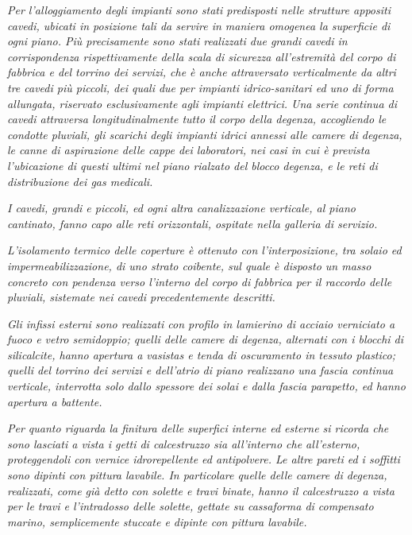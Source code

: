 \begin{quoting}
\sdots

	\emph{Per l'alloggiamento degli impianti sono stati predisposti nelle strutture appositi cavedi, ubicati in posizione tali da servire in maniera omogenea la superficie di ogni piano. Più precisamente sono stati realizzati due grandi cavedi in corrispondenza rispettivamente della scala di sicurezza all'estremità del corpo di fabbrica e del torrino dei servizi, che è anche attraversato verticalmente da altri tre cavedi più piccoli, dei quali due per impianti idrico-sanitari ed uno di forma allungata, riservato esclusivamente agli impianti elettrici. Una serie continua di cavedi attraversa longitudinalmente tutto il corpo della degenza, accogliendo le condotte pluviali, gli scarichi degli impianti idrici annessi alle camere di degenza, le canne di aspirazione delle cappe dei laboratori, nei casi in cui è prevista l'ubicazione di questi ultimi nel piano rialzato del blocco degenza, e le reti di distribuzione dei gas medicali.}

\sdots

	\emph{I cavedi, grandi e piccoli, ed ogni altra canalizzazione verticale, al piano cantinato, fanno capo alle reti orizzontali, ospitate nella galleria di servizio.}
	
	\emph{L'isolamento termico delle coperture è ottenuto con l'interposizione, tra solaio ed impermeabilizzazione, di uno strato coibente, sul quale è disposto un masso concreto con pendenza verso l'interno del corpo di fabbrica per il raccordo delle pluviali, sistemate nei cavedi precedentemente descritti.}

\sdots

	\emph{Gli infissi esterni sono realizzati con profilo in lamierino di acciaio verniciato a fuoco e vetro semidoppio; quelli delle camere di degenza, alternati con i blocchi di silicalcite, hanno apertura a vasistas e tenda di oscuramento in tessuto plastico; quelli del torrino dei servizi e dell'atrio di piano realizzano una fascia continua verticale, interrotta solo dallo spessore dei solai e dalla fascia parapetto, ed hanno apertura a battente.}

\sdots

	\emph{Per quanto riguarda la finitura delle superfici interne ed esterne si ricorda che sono lasciati a vista i getti di calcestruzzo sia all'interno che all'esterno, proteggendoli con vernice idrorepellente ed antipolvere. Le altre pareti ed i soffitti sono dipinti con pittura lavabile. In particolare quelle delle camere di degenza, realizzati, come già detto con solette e travi binate, hanno il calcestruzzo a vista per le travi e l'intradosso delle solette, gettate su cassaforma di compensato marino, semplicemente stuccate e dipinte con pittura lavabile.}
\end{quoting}
